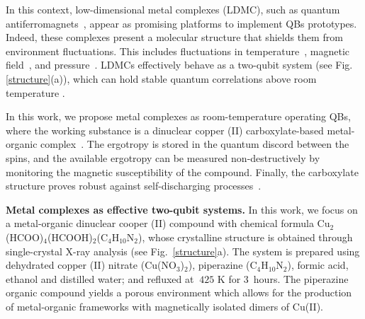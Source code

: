 \documentclass[aps,prl,epsfigure,twocolumn,superscriptaddress]{revtex4-1}
\newcommand{\1}{\mathbbm{1}}
\begin{document}
In this context, low-dimensional metal complexes (LDMC), such as quantum antiferromagnets~\cite{cruz,souza,mario2,kova2020unconventional,cruz2020quantifying,souza2,he2017quantum,he2017quantum,breunig2017quantum,kova2020unconventional}, appear as promising platforms to implement QBs prototypes. Indeed, these complexes present a molecular structure that shields them from environment fluctuations. This includes fluctuations in temperature~\cite{mario2,kova2020unconventional}, magnetic field~\cite{kova2020unconventional,cruz2020quantifying,souza2}, and pressure~\cite{cruz2017influence,cruz2020quantifying}. LDMCs effectively behave as a two-qubit system (see Fig.\ref{structure}(a)), which can hold stable quantum correlations above room temperature \cite{cruz,mario2,souza}.

In this work, we propose metal complexes as room-temperature operating QBs, where the working substance is a dinuclear copper (II) carboxylate-based metal-organic complex~\cite{cruz}. The ergotropy is stored in the quantum discord between the spins, and the available ergotropy can be measured non-destructively by monitoring the magnetic susceptibility of the compound.
Finally, the carboxylate structure proves robust against self-discharging processes~\cite{Santos:20d}. 

\textbf{Metal complexes as effective two-qubit systems.} In this work, we focus on a metal-organic dinuclear cooper (II) compound with chemical formula Cu$_2$(HCOO)$_4$(HCOOH)$_2$(C$_4$H$_{10}$N$_2$), whose crystalline structure is obtained through single-crystal X-ray analysis \cite{ccdc} (see Fig.~\ref{structure}{\color{blue}a}). The system is prepared using dehydrated copper (II) nitrate (Cu(NO$_3$)$_2$), piperazine (C$_4$H$_{10}$N$_2$), formic acid, ethanol and distilled water; and refluxed at $~425$ K for 3~hours. The piperazine organic compound yields a porous environment which allows for the production of metal-organic frameworks with magnetically isolated dimers of Cu(II). 
\end{document}

